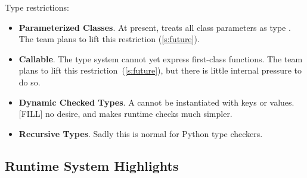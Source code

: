 \documentclass[a4paper,english,cleveref,autoref,thm-restate,anonymous,]{lipics-v2021}
\begin{document}
Type restrictions:

\begin{itemize}
  \item \textbf{Parameterized Classes}.
    At present, \SP{} treats all class parameters as type .
    The team plans to lift this restriction (\cref{s:future}).

  \item \textbf{Callable}.
    The type system cannot yet express first-class functions.
    The team plans to lift this restriction~(\cref{s:future}),
    but there is little internal pressure to do so.

  \item \textbf{Dynamic Checked Types}.
    A  cannot be instantiated with 
    keys or values.
    [FILL] no desire, and makes runtime checks much simpler.

  \item \textbf{Recursive Types}.
    Sadly this is normal for Python type checkers.

\end{itemize}




\subsection{Runtime System Highlights}
\end{document}

